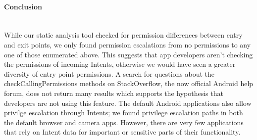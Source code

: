 \documentclass[12pt,a4paper]{article}
\begin{document}
\paragraph{Conclusion} ~\\
While our static analysis tool checked for permission differences between
entry and exit points, we only found permission escalations from no permissions
to any one of those enumerated above. This suggests that app developers aren't
checking the permissions of incoming Intents, otherwise we would have seen a
greater diversity of entry point permissions. A search for
questions about the checkCallingPermissions methods on StackOverflow, the now
official Android help forum, does not return many results which supports the
hypothesis that developers are not using this feature. The default Android
applications also allow privilge escalation through Intents; we found privilege
escalation paths in both the default browser and camera apps. However, there
are very few applications that rely on Intent data for important or sensitive
parts of their functionality.

\end{document}
